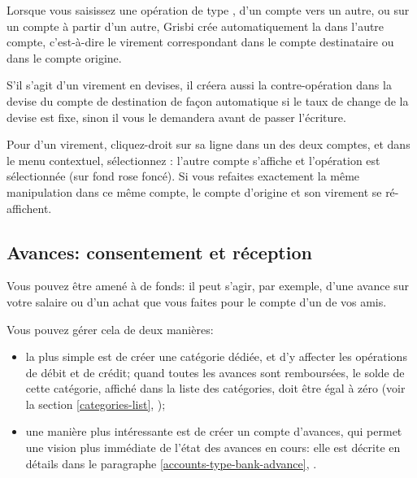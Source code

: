Lorsque vous saisissez une opération de type , d'un compte vers un autre, ou sur un compte à partir d'un autre, Grisbi crée automatiquement la  dans l'autre compte, c'est-à-dire le virement correspondant dans le compte destinataire ou dans le compte origine.

S'il s'agit d'un virement en devises, il créera aussi la contre-opération dans la devise du compte de destination de façon automatique si le taux de change de la devise est fixe, sinon il vous le demandera avant de passer l'écriture.

Pour  d'un virement, cliquez-droit sur sa ligne dans un des deux comptes, et dans le menu contextuel, sélectionnez : l'autre compte s'affiche et l'opération est sélectionnée (sur \colorbox[RGB]{245,155,155}{fond rose foncé}). Si vous refaites exactement la même manipulation dans ce même compte, le compte d'origine et son virement se ré-affichent.


\subsection{Avances: consentement et réception\label{transactions-new-advance}}

Vous pouvez être amené à  de fonds: il peut s'agir, par exemple, d'une avance sur votre salaire ou d'un achat que vous faites pour le compte d'un de vos amis.

Vous pouvez gérer cela de deux manières:
\begin{itemize}
	\item la plus simple est de créer une catégorie dédiée, et d'y affecter les opérations de débit et de crédit; quand toutes les avances sont remboursées, le solde de cette catégorie, affiché dans la liste des catégories, doit être égal à zéro (voir la section \vref{categories-list}, ); 
	\item une manière plus intéressante est de créer un compte d'avances, qui permet une vision plus immédiate de l'état des avances en cours: elle est décrite en détails dans le paragraphe \vref{accounts-type-bank-advance}, .
\end{itemize}


